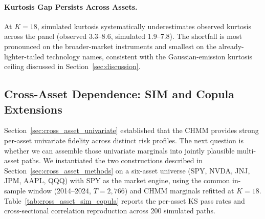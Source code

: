\paragraph{Kurtosis Gap Persists Across Assets.}
At $K = 18$, simulated kurtosis systematically underestimates observed kurtosis across the panel (observed 3.3--8.6, simulated 1.9--7.8).
The shortfall is most pronounced on the broader-market instruments and smallest on the already-lighter-tailed technology names, consistent with the Gaussian-emission kurtosis ceiling discussed in Section~\ref{sec:discussion}.

\begin{table}[t]
\centering
\caption{Cross-asset univariate generalization (CHMM, $K = 18$, 1{,}000 paths, $\alpha = 0.05$). Each ticker fitted independently.}
\label{tab:cross_asset}
\end{table}

\subsection{Cross-Asset Dependence: SIM and Copula Extensions}
\label{sec:cross_asset}

Section~\ref{sec:cross_asset_univariate} established that the CHMM provides strong per-asset univariate fidelity across distinct risk profiles.
The next question is whether we can assemble those univariate marginals into jointly plausible multi-asset paths.
We instantiated the two constructions described in Section~\ref{sec:cross_asset_methods} on a six-asset universe (SPY, NVDA, JNJ, JPM, AAPL, QQQ) with SPY as the market engine, using the common in-sample window (2014--2024, $T = 2{,}766$) and CHMM marginals refitted at $K = 18$.
Table~\ref{tab:cross_asset_sim_copula} reports the per-asset KS pass rates and cross-sectional correlation reproduction across 200 simulated paths.

